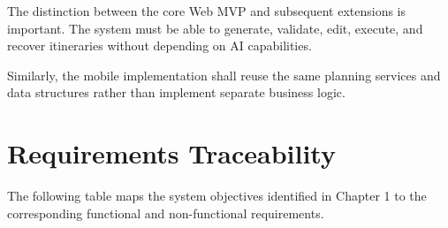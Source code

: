 The distinction between the core Web MVP and subsequent extensions is important. The system must be able to generate, validate, edit, execute, and recover itineraries without depending on AI capabilities.


Similarly, the mobile implementation shall reuse the same planning services and data structures rather than implement separate business logic.


\section{Requirements Traceability}

The following table maps the system objectives identified in Chapter 1 to the corresponding functional and non-functional requirements.


\begingroup
\small
\setlength{\tabcolsep}{5pt}
\renewcommand{\arraystretch}{1.18}

